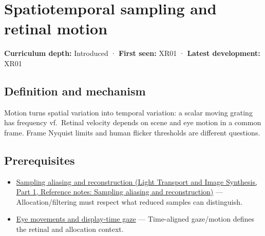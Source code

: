 \hypertarget{appendix-70895739febb}{}\label{referencestart:appendix-70895739febb}
\section{Spatiotemporal sampling and retinal motion}\label{appendix-70895739febb-spatiotemporal-sampling-and-retinal-motion}

\hypertarget{appendix-70895739febb-spatiotemporal-sampling-and-retinal-motion}{}

\textbf{Curriculum depth:} Introduced · \textbf{First seen:} XR01 · \textbf{Latest development:} XR01

\begin{allmightroledefinition}

\subsection{Definition and mechanism}\label{appendix-70895739febb-definition-and-mechanism}

\hypertarget{appendix-70895739febb-definition-and-mechanism}{}

Motion turns spatial variation into temporal variation: a scalar moving grating has frequency \textbar v\textbar f.~Retinal velocity depends on scene and eye motion in a common frame. Frame Nyquist limits and human flicker thresholds are different questions.

\end{allmightroledefinition}

\subsection{Prerequisites}\label{appendix-70895739febb-prerequisites}

\hypertarget{appendix-70895739febb-prerequisites}{}

\begin{itemize}
\tightlist
\item
  \href{../04-Light-Transport-and-Image-Synthesis-P01/main.pdf\#appendix-6a7869dd79a6}{Sampling aliasing and reconstruction (Light Transport and Image Synthesis, Part 1, Reference notes: Sampling aliasing and reconstruction)} --- Allocation/filtering must respect what reduced samples can distinguish.
\item
  \hyperref[appendix-a6f2c4fe1996]{Eye movements and display-time gaze} --- Time-aligned gaze/motion defines the retinal and allocation context.
\end{itemize}


